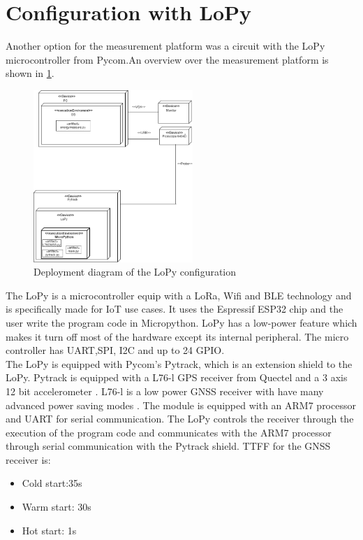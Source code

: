 \section{Configuration with LoPy}
Another option for the measurement platform was a circuit with the LoPy microcontroller from Pycom.An overview over the measurement platform is shown in \ref{fig:LoPy_deploy}. 

\begin{figure}[H]
\centering
\includegraphics[height=6.5cm]{Project_Report/Images/LoPy_deploy.png}
\caption{Deployment diagram of the LoPy configuration}
\label{fig:LoPy_deploy}
\end{figure}

The LoPy is a microcontroller equip with a LoRa, Wifi and BLE technology \cite{LoPy} and is specifically made for IoT use cases. It uses the Espressif ESP32 chip and the user write the program code in Micropython. LoPy has a low-power feature which makes it turn off most of the hardware except its internal peripheral. The micro controller has UART,SPI, I2C and up to 24 GPIO.\\ The LoPy is equipped with Pycom's Pytrack, which is an extension shield to the LoPy. Pytrack is equipped with a L76-l GPS receiver from Quectel and a 3 axis 12 bit accelerometer \cite{Pytrack}. L76-l is a low power GNSS receiver with have many advanced power saving modes \cite{L76}. The module is equipped with an ARM7 processor and UART for serial communication. The LoPy controls the receiver through the execution of the program code and communicates with the ARM7 processor through serial communication with the Pytrack shield. TTFF for the GNSS receiver is:
\begin{itemize}
\item Cold start:35s
\item Warm start: 30s
\item Hot start: 1s


\end{itemize}


